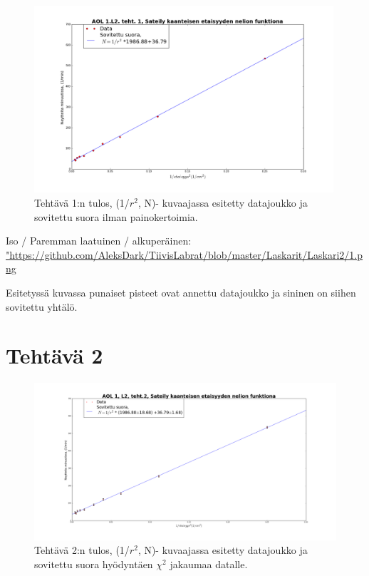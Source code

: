 \documentclass[a4paper, 12pt]{article}
\begin{document}
\iffalse

\begin{figure}
\includegraphics[width=0.99\textwidth]{1}
\caption{Tehtävä 1:n tulos, (1/$r^2$, N)- kuvaajassa esitetty datajoukko ja sovitettu suora ilman painokertoimia.}
\end{figure}

Iso / Paremman laatuinen / alkuperäinen: \url{"https://github.com/AleksDark/TiivisLabrat/blob/master/Laskarit/Laskari2/1.png}

Esitetyssä kuvassa punaiset pisteet ovat annettu datajoukko ja  sininen on siihen sovitettu yhtälö.



\section*{Tehtävä 2}
\begin{figure}
\includegraphics[width=1\textwidth]{2}
\caption{Tehtävä 2:n tulos, (1/$r^2$, N)- kuvaajassa esitetty datajoukko ja sovitettu suora hyödyntäen $\chi^2$ jakaumaa datalle.}
\end{figure}
\end{document}
